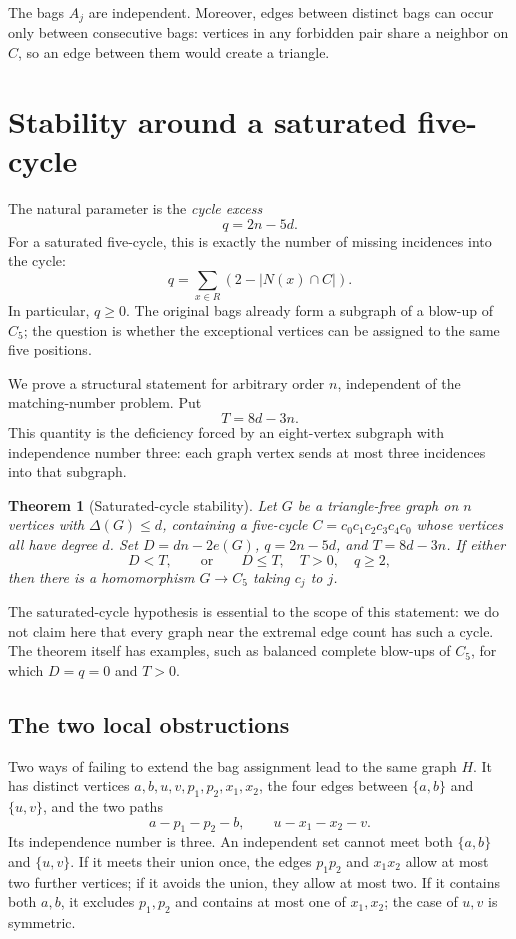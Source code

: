 \documentclass[11pt]{article}
\newtheorem{theorem}{Theorem}[section]
\theoremstyle{definition}
\theoremstyle{remark}
\newcommand{\N}{N}
\begin{document}
The bags $A_j$ are independent. Moreover, edges between distinct bags can
occur only between consecutive bags: vertices in any forbidden pair share a
neighbor on $C$, so an edge between them would create a triangle.

\section{Stability around a saturated five-cycle}\label{sec:hard-case}

The natural parameter is the \emph{cycle excess}
\[
  q=2n-5d.
\]
For a saturated five-cycle, this is exactly the number of missing incidences
into the cycle:
\[
  q=\sum_{x\in R}(2-|\N(x)\cap C|).
\]
In particular, $q\ge0$. The original bags already form a subgraph of a
blow-up of $C_5$; the question is whether the exceptional vertices can be
assigned to the same five positions.

We prove a structural statement for arbitrary order $n$, independent of the
matching-number problem. Put
\[
  T=8d-3n.
\]
This quantity is the deficiency forced by an eight-vertex subgraph with
independence number three: each graph vertex sends at most three incidences
into that subgraph.

\begin{theorem}[Saturated-cycle stability]\label{thm:stability}
Let $G$ be a triangle-free graph on $n$ vertices with $\Delta(G)\le d$,
containing a five-cycle $C=c_0c_1c_2c_3c_4c_0$ whose vertices all have
degree $d$. Set $D=dn-2e(G)$, $q=2n-5d$, and $T=8d-3n$.
If either
\[
  D<T,
  \qquad\text{or}\qquad
  D\le T,\quad T>0,\quad q\ge2,
\]
then there is a homomorphism $G\to C_5$ taking $c_j$ to $j$.
\end{theorem}

The saturated-cycle hypothesis is essential to the scope of this statement:
we do not claim here that every graph near the extremal edge count has such
a cycle. The theorem itself has examples, such as balanced complete blow-ups
of $C_5$, for which $D=q=0$ and $T>0$.

\subsection{The two local obstructions}

Two ways of failing to extend the bag assignment lead to the same graph $H$.
It has distinct vertices $a,b,u,v,p_1,p_2,x_1,x_2$, the four edges between
$\{a,b\}$ and $\{u,v\}$, and the two paths
\[
  a-p_1-p_2-b,\qquad u-x_1-x_2-v.
\]
Its independence number is three. An independent set cannot meet both
$\{a,b\}$ and $\{u,v\}$. If it meets their union once, the edges $p_1p_2$
and $x_1x_2$
allow at most two further vertices; if it avoids the union, they allow at
most two. If it contains both $a,b$, it excludes $p_1,p_2$ and contains at
most one of $x_1,x_2$; the case of $u,v$ is symmetric.
\end{document}
